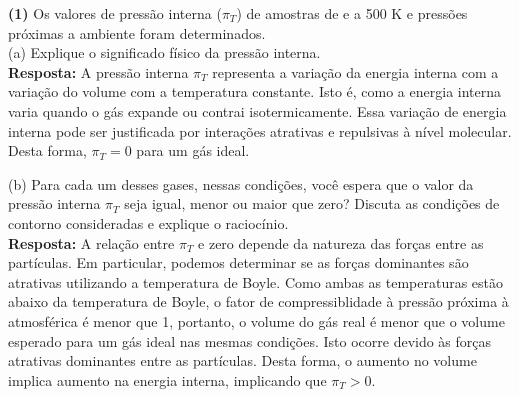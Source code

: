 \textbf{(1)} Os valores de pressão interna (\(\pi_T\)) de amostras de  e
 a 500 K e pressões próximas a ambiente foram determinados.\\

(a) Explique o significado físico da pressão interna.\\

\textbf{Resposta:}   A pressão interna \( \pi_T \) representa a variação da energia interna com a
   variação do volume com a temperatura constante. Isto é, como a energia
   interna varia quando o gás expande ou contrai isotermicamente. Essa variação
   de energia interna pode ser justificada por interações atrativas e repulsivas
   à nível molecular. Desta forma, \( \pi_T = 0 \) para um gás ideal. 

(b) Para cada um desses gases, nessas condições, você espera que o valor da
pressão interna \(\pi_T\)  seja igual, menor ou maior que zero? Discuta as
condições de contorno consideradas e explique o raciocínio.\\

\textbf{Resposta:} A relação entre \( \pi_T \) e zero depende da natureza das
forças entre as partículas. Em particular, podemos determinar se as forças
dominantes são atrativas utilizando a temperatura de Boyle. Como ambas as
temperaturas estão abaixo da temperatura de Boyle, o fator de compressiblidade à
pressão próxima à atmosférica é menor que 1, portanto, o volume do gás real é
menor que o volume esperado para um gás ideal nas mesmas condições. Isto ocorre
devido às forças atrativas dominantes entre as partículas. Desta forma, o
aumento no volume implica aumento na energia interna, implicando que \( \pi_T >
0 \).
